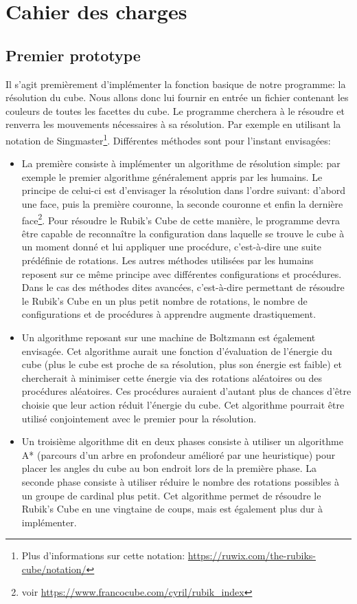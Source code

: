\chapter{Cahier des charges}
\section{Premier prototype}
Il s'agit premièrement d'implémenter la fonction basique de notre programme: la résolution du cube. Nous allons donc lui fournir en entrée un fichier contenant les couleurs de toutes les facettes du cube. Le programme cherchera à le résoudre et renverra les mouvements nécessaires à sa résolution. Par exemple en utilisant la notation de Singmaster\footnote{Plus d'informations sur cette notation: \url{https://ruwix.com/the-rubiks-cube/notation/}}.
Différentes méthodes sont pour l'instant envisagées:
\begin{itemize}
    \item La première consiste à implémenter un algorithme de résolution simple: par exemple le premier algorithme généralement appris par les humains. Le principe de celui-ci est d'envisager la résolution dans l'ordre suivant: d'abord une face, puis la première couronne, la seconde couronne et enfin la dernière face\footnote {voir \url{https://www.francocube.com/cyril/rubik_index}}. Pour résoudre le Rubik's Cube de cette manière, le programme devra être capable de reconnaître la configuration dans laquelle se trouve le cube à un moment donné et lui
    appliquer une procédure, c'est-à-dire une suite prédéfinie de rotations. Les autres méthodes utilisées par les humains reposent sur ce même principe avec différentes configurations et procédures. Dans le cas des méthodes dites avancées, c'est-à-dire permettant de résoudre le Rubik's Cube en un plus petit nombre de rotations, le nombre de configurations et de procédures à apprendre augmente drastiquement.
    \item Un algorithme reposant sur une machine de Boltzmann est également envisagée. Cet algorithme aurait une fonction d'évaluation de l'énergie du cube (plus le cube est proche de sa résolution, plus son énergie est faible) et chercherait à minimiser cette énergie via des rotations aléatoires ou des procédures aléatoires. Ces procédures auraient d'autant plus de chances d'être choisie que leur action réduit l'énergie du cube. Cet algorithme pourrait être utilisé conjointement avec le premier pour la résolution.
    \item Un troisième algorithme dit en deux phases consiste à utiliser un algorithme A* (parcours d'un arbre en profondeur amélioré par une heuristique) pour placer les angles du cube au bon endroit lors de la première phase. La seconde phase consiste à utiliser réduire le nombre des rotations possibles à un groupe de cardinal plus petit. Cet algorithme permet de résoudre le Rubik's Cube en une vingtaine de coups, mais est également plus dur à implémenter.
\end{itemize}

